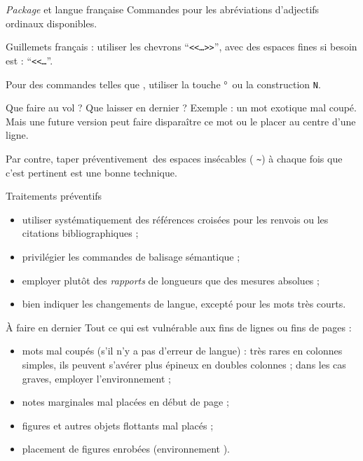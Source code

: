 \documentclass[pdf]{beamer}
\begin{document}
\begin{frame}{\foreignlanguage{english}{\emph{Package}
} et langue française}
Commandes pour les abréviations d'adjectifs ordinaux disponibles.\pause

Guillemets français : utiliser les chevrons ``\texttt{{<}{<}\ldots{>}{>}}'',
avec des espaces fines si besoin est :
``\texttt{{<}{<}\command{,}\ldots\command{,}{>}{>}}''.\pause 

Pour des commandes telles que \og {}\fg, utiliser la touche \og °\fg\
ou la construction \og \texttt{N}\fg.
\end{frame}

\begin{frame}{Que faire au vol ? Que laisser en dernier ?}
Exemple : un mot exotique mal coupé. Mais une future version peut faire
disparaître ce mot ou le placer au centre d'une ligne.\pause

Par contre, taper \og préventivement\fg\ des espaces insécables (\og
\texttt{\textasciitilde}\fg) à chaque fois que c'est pertinent est une bonne
technique.
\end{frame}

\begin{frame}{Traitements préventifs}
\begin{itemize}
 \item utiliser systématiquement des références croisées pour les renvois ou
les citations bibliographiques ;\pause
 \item privilégier les commandes de balisage sémantique ;\pause
 \item employer plutôt des \emph{rapports} de longueurs que des mesures
absolues ;\pause
 \item bien indiquer les changements de langue, excepté pour les mots très
courts.
\end{itemize}
\end{frame}

\begin{frame}{À faire en dernier}
Tout ce qui est vulnérable aux fins de lignes ou fins de pages :\pause
\begin{itemize}
 \item mots mal coupés (s'il n'y a pas d'erreur de langue) : très rares en
colonnes simples, ils peuvent s'avérer plus épineux en doubles colonnes ; dans
les cas graves, employer l'environnement
\foreignlanguage{english}{} ;\pause
 \item notes marginales mal placées en début de page ;\pause
 \item figures et autres objets flottants mal placés ;\pause
 \item placement de figures enrobées (environnement
\foreignlanguage{english}{}).
\end{itemize}
\end{frame}
\end{document}
